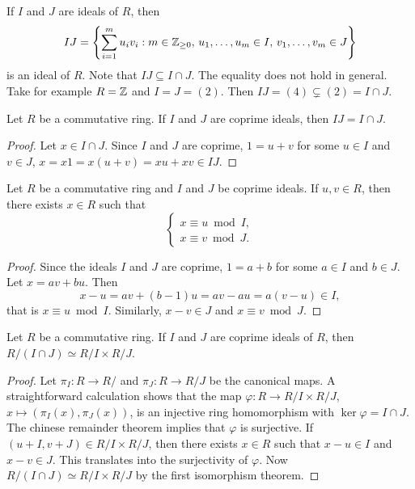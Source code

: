 If $I$ and $J$ are ideals of $R$, then 
\[
	IJ=\left\{\sum_{i=1}^mu_iv_i:m\in\mathbb{Z}_{\geq0},\,u_1,\dots,u_m\in I,\,v_1,\dots,v_m\in J\right\}
\]
is an ideal of $R$. Note that $IJ\subseteq I\cap J$. The equality does not hold in general. Take
for example $R=\mathbb{Z}$ and $I=J=(2)$. Then $IJ=(4)\subsetneq (2)=I\cap J$. 

\begin{proposition}
Let $R$ be a commutative ring. If $I$ and $J$ are coprime ideals, then $IJ=I\cap J$. 	
\end{proposition}

\begin{proof}
Let $x\in I\cap J$. Since $I$ and $J$ are coprime, 
$1=u+v$ for some $u\in I$ and $v\in J$, 
$x=x1=x(u+v)=xu+xv\in IJ$. 	
\end{proof}

\begin{theorem}
Let $R$ be a commutative ring and $I$ and $J$ be coprime ideals. If $u,v\in R$, then 
there exists $x\in R$ such that 
\[
\begin{cases}	
x\equiv u\bmod I,\\
x\equiv v\bmod J.
\end{cases}
\]
\end{theorem}

\begin{proof}
Since the ideals $I$ and $J$ are coprime, $1=a+b$ for some $a\in I$ and $b\in J$. 
Let $x=av+bu$. Then
\[
x-u=av+(b-1)u=av-au=a(v-u)\in I,
\]
that is $x\equiv u\bmod I$. Similarly, $x-v\in J$ and $x\equiv v\bmod J$.  	
\end{proof}

\begin{corollary}
	Let $R$ be a commutative ring. If $I$ and $J$ are coprime ideals of $R$, 
	then $R/(I\cap J)\simeq R/I\times R/J$.
\end{corollary}

\begin{proof}
	Let $\pi_I\colon R\to R/$ and $\pi_J\colon R\to R/J$ be the canonical maps. A straightforward
	calculation shows that the
	map $\varphi\colon R\to R/I\times R/J$, $x\mapsto (\pi_I(x),\pi_J(x))$, 
	is an injective ring homomorphism with $\ker\varphi=I\cap J$.
	The chinese remainder theorem implies that $\varphi$ is surjective. If $(u+I,v+J)\in R/I\times R/J$, 
	then there exists $x\in R$ such that 
	$x-u\in I$ and $x-v\in J$. This translates into the surjectivity of $\varphi$. Now
	$R/(I\cap J)\simeq R/I\times R/J$ by the first isomorphism theorem. 
\end{proof}

